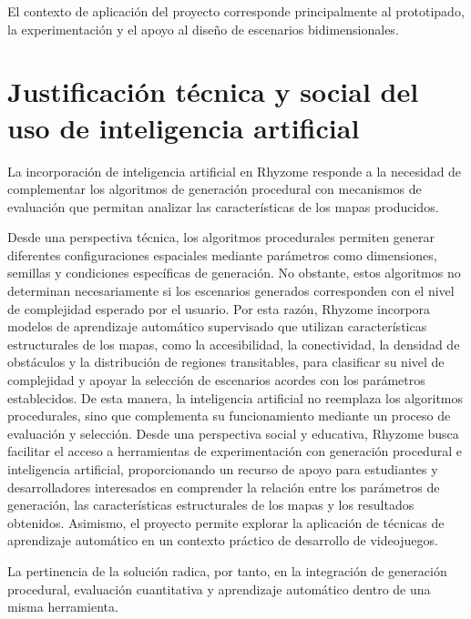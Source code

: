 El contexto de aplicación del proyecto corresponde principalmente al prototipado, la experimentación y el apoyo al diseño
de escenarios bidimensionales.


\section{Justificación técnica y social del uso de inteligencia artificial}


La incorporación de inteligencia artificial en Rhyzome responde a la necesidad de complementar los algoritmos de generación procedural con mecanismos de evaluación que permitan analizar las características de los mapas producidos.

Desde una perspectiva técnica, los algoritmos procedurales permiten generar diferentes configuraciones espaciales mediante parámetros como dimensiones, semillas y condiciones específicas de generación. No obstante, estos algoritmos no determinan necesariamente si los escenarios generados corresponden con el nivel de complejidad esperado por el usuario. Por esta razón, Rhyzome incorpora modelos de aprendizaje automático supervisado que utilizan características estructurales de los mapas, como la accesibilidad, la conectividad, la densidad de obstáculos y la distribución de regiones transitables, para clasificar su nivel de complejidad y apoyar la selección de escenarios acordes con los parámetros establecidos. De esta manera, la inteligencia artificial no reemplaza los algoritmos procedurales, sino que complementa su funcionamiento mediante un proceso de evaluación y selección. Desde una perspectiva social y educativa, Rhyzome busca facilitar el acceso a herramientas de experimentación con generación procedural e inteligencia artificial, proporcionando un recurso de apoyo para estudiantes y desarrolladores interesados en comprender la relación entre los parámetros de generación, las características estructurales de los mapas y los resultados obtenidos. Asimismo, el proyecto permite explorar la aplicación de técnicas de aprendizaje automático en un contexto práctico de desarrollo de videojuegos.

La pertinencia de la solución radica, por tanto, en la integración de generación procedural, evaluación cuantitativa y aprendizaje automático dentro de una misma herramienta.

